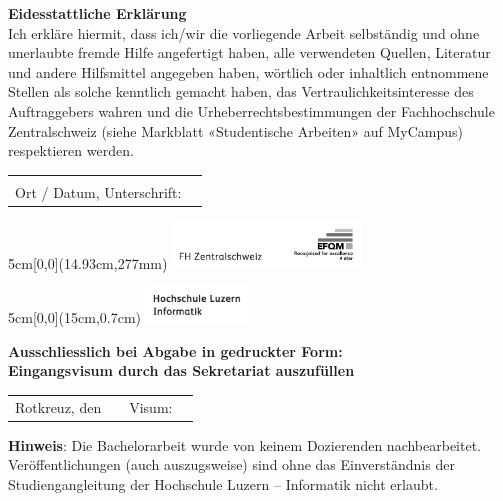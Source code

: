 \noindent
\textbf{Eidesstattliche Erklärung}
\\
Ich erkläre hiermit, dass ich/wir die vorliegende Arbeit selbständig und ohne unerlaubte fremde Hilfe angefertigt haben, alle verwendeten Quellen, Literatur und andere Hilfsmittel angegeben haben, wörtlich oder inhaltlich entnommene Stellen als solche kenntlich gemacht haben, das Vertraulichkeitsinteresse des Auftraggebers wahren und die Urheberrechtsbestimmungen der Fachhochschule Zentralschweiz (siehe Markblatt «Studentische Arbeiten» auf MyCampus) respektieren werden.

\vspace{2em}

\noindent
\begin{tabularx}{\textwidth}{@{}lX}
	&\\
	Ort / Datum, Unterschrift: &  \\
	\cline{2-2}
\end{tabularx}

\begin{textblock*}{5cm}[0,0](14.93cm,277mm)
	\includegraphics[keepaspectratio,width=5cm]{img/FHZ_Logo}
\end{textblock*}

\newpage

\begin{textblock*}{5cm}[0,0](15cm,0.7cm)
	\includegraphics[keepaspectratio,width=2.7cm]{img/HSLU_Logo_Header}
\end{textblock*}

\vspace{0.8cm}
\noindent
\textbf{Ausschliesslich bei Abgabe in gedruckter Form: \\ 
Eingangsvisum durch das Sekretariat auszufüllen}

\noindent
\renewcommand{\arraystretch}{2}
\begin{tabularx}{\textwidth}{@{}lXlX}
	Rotkreuz, den & & Visum: & \\
	\cline{2-2}
	\cline{4-4}
\end{tabularx}
\renewcommand{\arraystretch}{1}

\vfill
\noindent
\textbf{Hinweis}: Die Bachelorarbeit wurde von keinem Dozierenden nachbearbeitet.
Veröffentlichungen (auch auszugsweise) sind ohne das Einverständnis der Studiengangleitung der Hochschule Luzern – Informatik nicht erlaubt.

